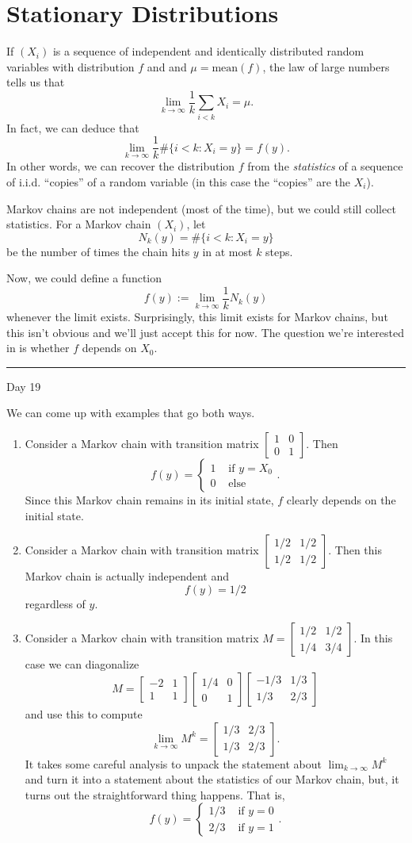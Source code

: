 \documentclass{problemset}
\newcommand{\mat}[1]{\begin{bmatrix}#1\end{bmatrix}}
\newcommand{\1}{\mathbf{1}}
\newcommand{\fatrule}[1]{\vspace{.3cm}\hrule {\hfill \sf #1}\par}
\begin{document}
\section*{Stationary Distributions}
	
	If $(X_i)$ is a sequence of independent and identically distributed random variables
	with distribution $f$ and 
	and $\mu = \text{mean}(f)$, the law of large numbers tells us that
	\[
		\lim_{k\to\infty} \frac{1}{k} \sum_{i<k} X_i = \mu.
	\]
	In fact, we can deduce that
	\[
		\lim_{k\to\infty} \frac{1}{k} \#\{i<k:X_i=y\} = f(y).
	\]
	In other words, we can recover the distribution $f$ from the \emph{statistics}
	of a sequence of i.i.d. ``copies'' of a random variable (in this case the ``copies''
	are the $X_i$).

	Markov chains are not independent (most of the time), but we could still collect statistics.
	For a Markov chain $(X_i)$, let
	\[
		N_k(y) = \#\{i<k:X_i=y\}
	\]
	be the number of times the chain hits $y$ in at most $k$ steps.

	Now, we could define a function
	\[
		f(y) := \lim_{k\to\infty} \frac{1}{k} N_k(y)
	\]
	whenever the limit exists.  Surprisingly, this limit exists for Markov chains, but this isn't obvious
	and we'll just accept this for now.  The question we're interested in is whether $f$ depends on $X_0$.

	\fatrule{Day 19}
	We can come up with examples that go both ways.
	\begin{enumerate}
		\item Consider a Markov chain with transition matrix $\mat{1&0\\0&1}$.  Then
			\[
				f(y) = \begin{cases}
					1 &\text{ if } y=X_0\\
					0 & \text{ else}
				\end{cases}.
			\]
			Since this Markov chain remains in its initial state, $f$ clearly depends on
			the initial state.
		\item Consider a Markov chain with transition matrix $\mat{1/2&1/2\\1/2&1/2}$.  Then
			this Markov chain is actually independent and
			\[
				f(y)=1/2
			\]
			regardless of $y$.
		\item Consider a Markov chain with transition matrix $M=\mat{1/2&1/2\\1/4 & 3/4}$.  In
			this case we can diagonalize 
			\[
				M=\mat{-2&1\\1&1} \mat{1/4&0\\0&1}\mat{-1/3&1/3\\1/3&2/3}
			\]
			and use this to compute
			\[
				\lim_{k\to\infty} M^k = \mat{1/3&2/3\\1/3&2/3}.
			\]
			It takes some careful analysis to unpack the statement about $\lim_{k\to\infty} M^k$
			and turn it into a statement about the statistics of our Markov chain,
			but, it turns out the straightforward thing happens.  That is,
			\[
				f(y)=\begin{cases}
					1/3&\text{ if }y=0\\
					2/3&\text{ if }y=1
				\end{cases}.
			\]
	\end{enumerate}
\end{document}
